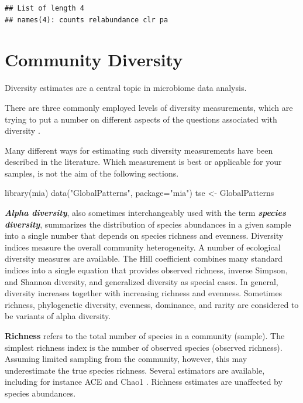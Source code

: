 \documentclass[
]{book}
\newenvironment{Shaded}{\begin{snugshade}}{\end{snugshade}}
\newcommand{\AttributeTok}[1]{\textcolor[rgb]{0.77,0.63,0.00}{#1}}
\newcommand{\FunctionTok}[1]{\textcolor[rgb]{0.00,0.00,0.00}{#1}}
\newcommand{\NormalTok}[1]{#1}
\newcommand{\OtherTok}[1]{\textcolor[rgb]{0.56,0.35,0.01}{#1}}
\newcommand{\StringTok}[1]{\textcolor[rgb]{0.31,0.60,0.02}{#1}}
\begin{document}
\begin{verbatim}
## List of length 4
## names(4): counts relabundance clr pa
\end{verbatim}

\hypertarget{community-diversity}{%
\chapter{Community Diversity}\label{community-diversity}}

Diversity estimates are a central topic in microbiome data analysis.

There are three commonly employed levels of diversity measurements,
which are trying to put a number on different aspects of the questions
associated with diversity \citep{Whittaker1960}.

Many different ways for estimating such diversity measurements have been
described in the literature. Which measurement is best or applicable for your
samples, is not the aim of the following sections.

\begin{Shaded}
\begin{Highlighting}[]
\FunctionTok{library}\NormalTok{(mia)}
\FunctionTok{data}\NormalTok{(}\StringTok{"GlobalPatterns"}\NormalTok{, }\AttributeTok{package=}\StringTok{"mia"}\NormalTok{)}
\NormalTok{tse }\OtherTok{\textless{}{-}}\NormalTok{ GlobalPatterns}
\end{Highlighting}
\end{Shaded}

\textbf{\emph{Alpha diversity}}, also sometimes interchangeably used with the
term \textbf{\emph{species diversity}}, summarizes the distribution of species
abundances in a given sample into a single number that depends on
species richness and evenness. Diversity indices measure the overall
community heterogeneity. A number of ecological diversity measures are
available. The Hill coefficient combines many standard indices into a
single equation that provides observed richness, inverse Simpson, and
Shannon diversity, and generalized diversity as special cases. In
general, diversity increases together with increasing richness and
evenness. Sometimes richness, phylogenetic diversity, evenness, dominance,
and rarity are considered to be variants of alpha diversity.

\textbf{Richness} refers to the total number of species in a community
(sample). The simplest richness index is the number of observed
species (observed richness). Assuming limited sampling from the
community, however, this may underestimate the true species
richness. Several estimators are available, including for instance ACE
\citep{Chao1992} and Chao1 \citep{Chao1984}. Richness estimates are unaffected
by species abundances.
\end{document}
